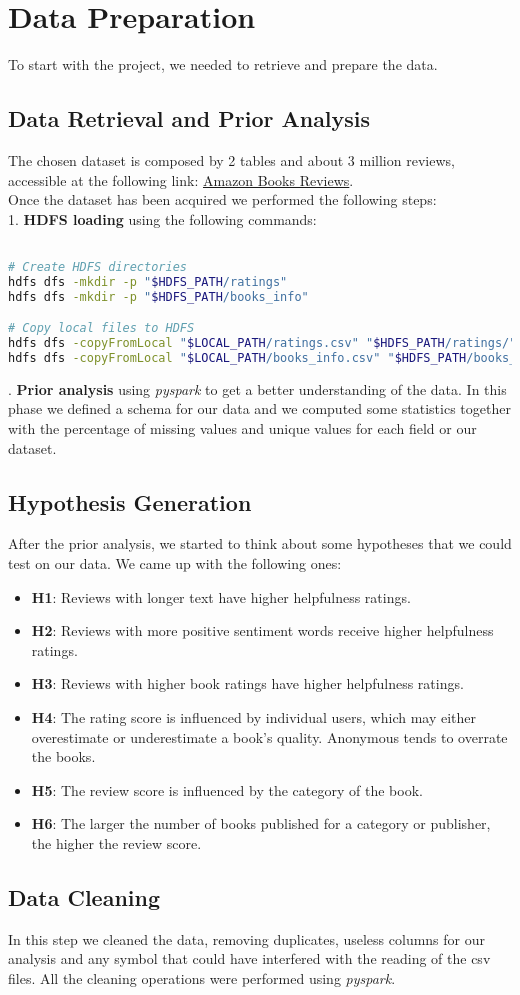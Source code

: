 \section{Data Preparation}
To start with the project, we needed to retrieve and prepare the data.

\subsection*{Data Retrieval and Prior Analysis}
The chosen dataset is composed by 2 tables and about 3 million reviews, accessible at the following link:
\href{https://www.kaggle.com/datasets/mohamedbakhet/amazon-books-reviews}{Amazon Books Reviews}. \\
Once the dataset has been acquired we performed the following steps:\\
1. \textbf{HDFS loading} using the following commands:
\lstset{
    basicstyle=\ttfamily,
    frame=single,
    breaklines=true
}
\begin{lstlisting}[language=bash]

# Create HDFS directories
hdfs dfs -mkdir -p "$HDFS_PATH/ratings"
hdfs dfs -mkdir -p "$HDFS_PATH/books_info"

# Copy local files to HDFS
hdfs dfs -copyFromLocal "$LOCAL_PATH/ratings.csv" "$HDFS_PATH/ratings/"
hdfs dfs -copyFromLocal "$LOCAL_PATH/books_info.csv" "$HDFS_PATH/books_info/"
\end{lstlisting}

. \textbf{Prior analysis} using \textit{pyspark} to get a better understanding of the data. In this phase
we defined a schema for our data and we computed some statistics together with the percentage of missing values and
unique values for each field or our dataset.

\subsection*{Hypothesis Generation}
After the prior analysis, we started to think about some hypotheses that we could test on our data. We came up with
the following ones:

\begin{itemize}[leftmargin=*, noitemsep]
\item \textbf{H1}: Reviews with longer text have higher helpfulness ratings.
\item \textbf{H2}: Reviews with more positive sentiment words receive higher helpfulness ratings.
\item \textbf{H3}: Reviews with higher book ratings have higher helpfulness ratings.
\item \textbf{H4}: The rating score is influenced by individual users, which may either overestimate or underestimate a book's quality. Anonymous tends to overrate the books.
\item \textbf{H5}: The review score is influenced by the category of the book.
\item \textbf{H6}: The larger the number of books published for a category or publisher, the higher the review score.
\end{itemize}

\subsection*{Data Cleaning}
In this step we cleaned the data, removing duplicates, useless columns for our analysis and any symbol that could
have interfered with the reading of the csv files. All the cleaning operations were performed using \textit{pyspark}.